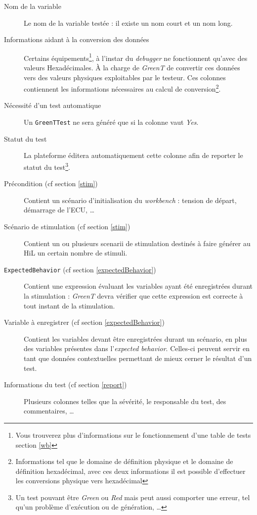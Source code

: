 \begin{description} 
	\item[Nom de la variable] Le nom de la variable testée : il existe un nom court et un nom long.
	\item[Informations aidant à la conversion des données] Certains équipements\footnote{Vous trouverez plus d'informations sur le fonctionnement d'une table de tests section \ref{wb}}, à l'instar du \textit{debugger} ne fonctionnent qu'avec des
	valeurs Hexadécimales. À la charge de \textit{GreenT} de convertir ces données vers des valeurs physiques exploitables par
	le testeur. Ces colonnes contiennent les informations nécessaires au calcul de conversion\footnote{Informations tel que le
		domaine de définition physique et le domaine de définition hexadécimal, avec ces deux informations il est possible d'effectuer les conversions physique vers hexadécimal}.
	\item[Nécessité d'un test automatique] Un \texttt{GreenTTest} ne sera généré que si la colonne vaut \textit{Yes}.
	\item[Statut du test] La plateforme éditera automatiquement cette colonne afin de reporter le statut du test\footnote{Un test pouvant être \textit{Green} ou \textit{Red}
		mais peut aussi comporter une erreur, tel qu'un problème d'exécution ou de génération, \ldots}.
	\item[Précondition (cf section \ref{stim})] Contient un scénario d'initialisation du \textit{workbench} : tension de départ,
	démarrage de l'ECU, \ldots
	\item[Scénario de stimulation (cf section \ref{stim})] Contient un ou plusieurs scenarii de stimulation destinés à faire générer au HiL un certain nombre de stimuli.
	\item[\texttt{ExpectedBehavior} (cf section \ref{expectedBehavior})] Contient une expression évaluant les variables ayant été enregistrées durant la stimulation : \textit{GreenT} devra vérifier que cette expression est correcte à tout instant de la stimulation.
	\item[Variable à enregistrer (cf section \ref{expectedBehavior})] Contient les variables devant être enregistrées durant un
	scénario, en plus des variables présentes dans l'\textit{expected behavior}. Celles-ci peuvent servir en tant que données
	contextuelles permettant de mieux cerner le résultat d'un test.
	\item[Informations du test (cf section \ref{report})] Plusieurs colonnes telles que la sévérité, le responsable du test, des commentaires, \ldots
\end{description}


